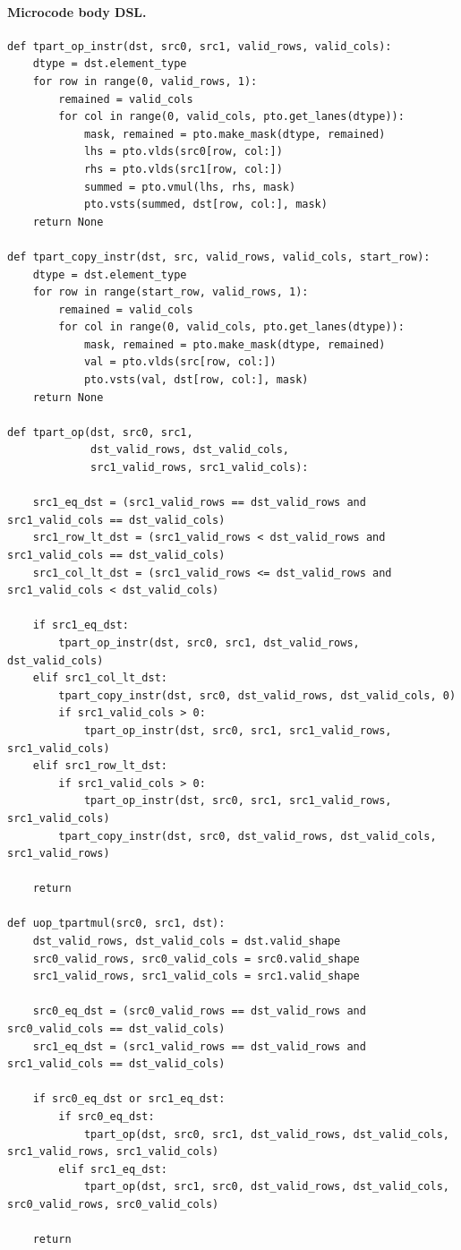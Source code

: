 \paragraph{Microcode body DSL.}
\begin{lstlisting}[style=ptocode]
def tpart_op_instr(dst, src0, src1, valid_rows, valid_cols):
    dtype = dst.element_type
    for row in range(0, valid_rows, 1):
        remained = valid_cols
        for col in range(0, valid_cols, pto.get_lanes(dtype)):
            mask, remained = pto.make_mask(dtype, remained)
            lhs = pto.vlds(src0[row, col:])
            rhs = pto.vlds(src1[row, col:])
            summed = pto.vmul(lhs, rhs, mask)
            pto.vsts(summed, dst[row, col:], mask)
    return None

def tpart_copy_instr(dst, src, valid_rows, valid_cols, start_row):
    dtype = dst.element_type
    for row in range(start_row, valid_rows, 1):
        remained = valid_cols
        for col in range(0, valid_cols, pto.get_lanes(dtype)):
            mask, remained = pto.make_mask(dtype, remained)
            val = pto.vlds(src[row, col:])
            pto.vsts(val, dst[row, col:], mask)
    return None

def tpart_op(dst, src0, src1,
             dst_valid_rows, dst_valid_cols,
             src1_valid_rows, src1_valid_cols):

    src1_eq_dst = (src1_valid_rows == dst_valid_rows and src1_valid_cols == dst_valid_cols)
    src1_row_lt_dst = (src1_valid_rows < dst_valid_rows and src1_valid_cols == dst_valid_cols)
    src1_col_lt_dst = (src1_valid_rows <= dst_valid_rows and src1_valid_cols < dst_valid_cols)

    if src1_eq_dst:
        tpart_op_instr(dst, src0, src1, dst_valid_rows, dst_valid_cols)
    elif src1_col_lt_dst:
        tpart_copy_instr(dst, src0, dst_valid_rows, dst_valid_cols, 0)
        if src1_valid_cols > 0:
            tpart_op_instr(dst, src0, src1, src1_valid_rows, src1_valid_cols)
    elif src1_row_lt_dst:
        if src1_valid_cols > 0:
            tpart_op_instr(dst, src0, src1, src1_valid_rows, src1_valid_cols)
        tpart_copy_instr(dst, src0, dst_valid_rows, dst_valid_cols, src1_valid_rows)

    return

def uop_tpartmul(src0, src1, dst):
    dst_valid_rows, dst_valid_cols = dst.valid_shape
    src0_valid_rows, src0_valid_cols = src0.valid_shape
    src1_valid_rows, src1_valid_cols = src1.valid_shape

    src0_eq_dst = (src0_valid_rows == dst_valid_rows and src0_valid_cols == dst_valid_cols)
    src1_eq_dst = (src1_valid_rows == dst_valid_rows and src1_valid_cols == dst_valid_cols)

    if src0_eq_dst or src1_eq_dst:
        if src0_eq_dst:
            tpart_op(dst, src0, src1, dst_valid_rows, dst_valid_cols, src1_valid_rows, src1_valid_cols)
        elif src1_eq_dst:
            tpart_op(dst, src1, src0, dst_valid_rows, dst_valid_cols, src0_valid_rows, src0_valid_cols)

    return
\end{lstlisting}
\Needspace{0.50\textheight}
